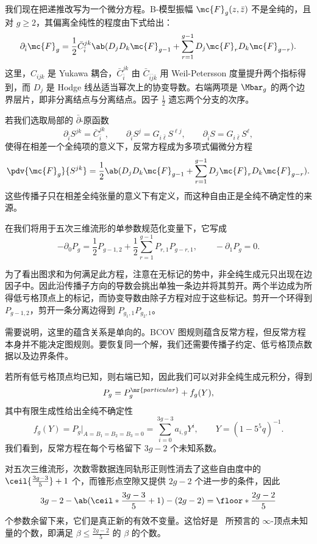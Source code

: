 我们现在把递推改写为一个微分方程。B-模型振幅 \(\mc{F}_g(z,\bar{z})\) 不是全纯的，且对 \(g \geq 2\)，其偏离全纯性的程度由下式给出：
\[ \partial_{\bar{i}} \mc{F}_g = \frac{1}{2}\bar{C}_{\bar{i}}^{jk}\ab( D_j D_k \mc{F}_{g-1} + \sum_{r=1}^{g-1} D_j \mc{F}_r D_k \mc{F}_{g-r} ). \]
这里，\(C_{ijk}\) 是 Yukawa 耦合，\(\bar{C}_{\bar{i}}^{jk}\) 由 \(\bar{C}_{\bar{i}\bar{j}\bar{k}}\) 用 Weil-Petersson 度量提升两个指标得到，而 \(D_j\) 是 Hodge 线丛适当幂次上的协变导数。右端两项是 \(\Mbar_g\) 的两个边界层片，即非分离结点与分离结点。因子 \(\frac{1}{2}\) 遗忘两个分支的次序。

若我们选取局部的 \(\bar{\partial}\)-原函数
\[ \partial_{\bar{i}}S^{jk} = \bar{C}_{\bar{i}}^{jk}, \qquad \partial_{\bar{i}}S^j = G_{i\bar{\ell}}S^{\ell j}, \qquad \partial_{\bar{i}}S = G_{i\bar{\ell}}S^{\ell}, \]
使得在相差一个全纯项的意义下，反常方程成为多项式偏微分方程
\[ \pdv{\mc{F}_g}{S^{jk}} = \frac{1}{2}\ab( D_jD_k \mc{F}_{g-1} + \sum_{r=1}^{g-1} D_j \mc{F}_r D_k \mc{F}_{g-r} ). \]
这些传播子只在相差全纯张量的意义下有定义，而这种自由正是全纯不确定性的来源。

\begin{rmk}
    在我们将用于五次三维流形的单参数规范化变量下，它写成
    \[ -\partial_0 P_g = \frac{1}{2}P_{g-1,2} + \frac{1}{2}\sum_{r=1}^{g-1}P_{r,1}P_{g-r,1}, \qquad -\partial_1 P_g = 0. \]
\end{rmk}

为了看出图求和为何满足此方程，注意在无标记的势中，非全纯生成元只出现在边因子中。因此沿传播子方向的导数会挑出单独一条边并将其剪开。两个半边成为所得低亏格顶点上的标记，而协变导数由除子方程对应于这些标记。剪开一个环得到 \(P_{g-1,2}\)，剪开一条分离边得到 \(P_{g_1,1}P_{g_2,1}\)。

\begin{rmk}
    需要说明，这里的蕴含关系是单向的。BCOV 图规则蕴含反常方程，但反常方程本身并不能决定图规则。要恢复同一个解，我们还需要传播子约定、低亏格顶点数据以及边界条件。
\end{rmk}

若所有低亏格顶点均已知，则右端已知，因此我们可以对非全纯生成元积分，得到
\[ P_g = P_g^{\mr{particular}} + f_g(Y), \]
其中有限生成性给出全纯不确定性
\[ f_g(Y) = P_g|_{A = B_1 = B_2 = B_3 = 0} = \sum_{i=0}^{3g-3}a_{i,g}Y^i, \qquad Y = (1-5^5q)^{-1}. \]
我们看到，反常方程在每个亏格留下 \(3g-2\) 个未知系数。

\begin{rmk}
    对五次三维流形，次数零数据连同轨形正则性消去了这些自由度中的 \(\ceil{\frac{3g-3}{5}}+1\) 个，而锥形点空隙又提供 \(2g-2\) 个进一步的条件，因此
    \[ 3g-2 - \ab(\ceil*{\frac{3g-3}{5}}+1) - (2g-2) = \floor*{\frac{2g-2}{5}} \]
    个参数余留下来，它们是真正新的有效不变量。这恰好是~ 所预言的 \(\infty\)-顶点未知量的个数，即满足 \(\beta \leq \frac{2g-2}{5}\) 的 \(\beta\) 的个数。
\end{rmk}

